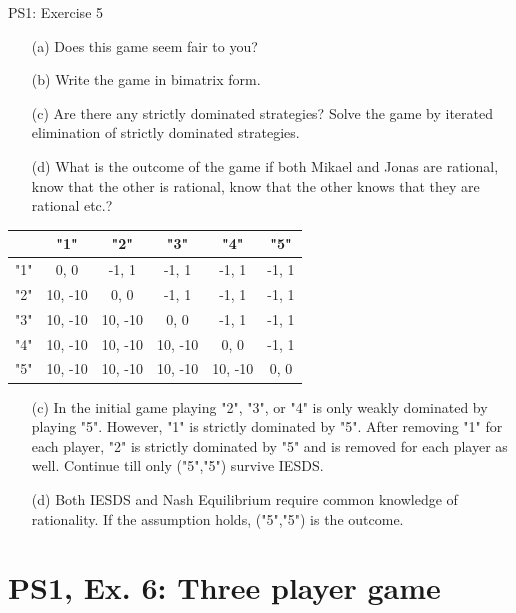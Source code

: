 \begin{frame}{PS1: Exercise 5}
\begin{multicols}{2}
  \begin{itemize}
    \item[(a)] Does this game seem fair to you?
    \item[(b)] Write the game in bimatrix form.
    \item[(c)] Are there any strictly dominated strategies? Solve the game by iterated elimination of strictly dominated strategies.
    \item[(d)] What is the outcome of the game if both Mikael and Jonas are rational, know that the other is rational, know that the other knows that they are rational etc.?
  \end{itemize}
\vfill\null \columnbreak
\begin{table}
  \footnotesize
  \begin{tabular}{c|c|c|c|c|c}
        & "1"     & "2"     & "3"     & "4"     & "5"     \\
    \midrule
    "1" & 0, 0    & -1, 1   & -1, 1   & -1, 1   & -1, 1   \\
    \midrule
    "2" & 10, -10 & 0, 0    & -1, 1   & -1, 1   & -1, 1   \\
    \midrule
    "3" & 10, -10 & 10, -10 & 0, 0    & -1, 1   & -1, 1   \\
    \midrule
    "4" & 10, -10 & 10, -10 & 10, -10 & 0, 0    & -1, 1   \\
    \midrule
    "5" & 10, -10 & 10, -10 & 10, -10 & 10, -10 & 0, 0    \\
  \end{tabular}
\end{table}
\begin{itemize}
  \item[(c)] In the initial game playing "2", "3", or "4" is only weakly dominated by playing "5". However, "1" is strictly dominated by "5". After removing "1" for each player, "2" is strictly dominated by "5" and is removed for each player as well. Continue till only ("5","5") survive IESDS.
  \item[(d)] Both IESDS and Nash Equilibrium require common knowledge of rationality. If the assumption holds, ("5","5") is the outcome.
\end{itemize}
\end{multicols}
\end{frame}


\section{PS1, Ex. 6: Three player game}

